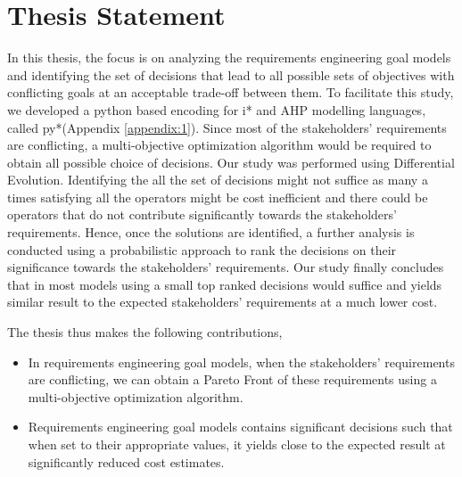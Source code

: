 \section{Thesis Statement}
\label{sec:intro:thesisStat}

In this thesis, the focus is on analyzing the requirements engineering goal models and identifying the set of decisions that lead to all possible sets of objectives with conflicting goals at an acceptable trade-off between them. To facilitate this study, we developed a python based encoding for i* and AHP modelling languages, called py*(Appendix \ref{appendix:1}). Since most of the stakeholders' requirements are conflicting, a multi-objective optimization algorithm would be required to obtain all possible choice of decisions. Our study was performed using Differential Evolution\cite{storn97}. Identifying the all the set of decisions might not suffice as many a times satisfying all the operators might be cost inefficient and there could be operators that do not contribute significantly towards the stakeholders' requirements. Hence,  once the solutions are identified, a further analysis is conducted using a probabilistic approach to rank the decisions on their significance towards the stakeholders' requirements. Our study finally concludes that in most models using a small top ranked decisions would suffice and yields similar result to the expected stakeholders' requirements at a much lower cost.

\medskip
The thesis thus makes the following contributions,

\begin{itemize}
    \item In requirements engineering goal models, when the stakeholders' requirements are conflicting, we can obtain a Pareto Front \cite{miettinen99} of these requirements using a multi-objective optimization algorithm.
    
    \item Requirements engineering goal models contains significant decisions such that when set to their appropriate values, it yields close to the expected result at significantly reduced cost estimates.
\end{itemize}
